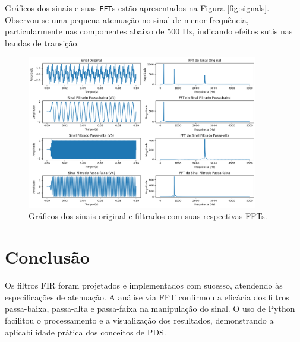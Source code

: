 \documentclass[a4paper,12pt]{article}
\begin{document}
Gráficos dos sinais e suas \texttt{FFT}s estão apresentados na Figura \ref{fig:signals}. Observou-se uma pequena atenuação no sinal de menor frequência, particularmente nas componentes abaixo de 500 Hz, indicando efeitos sutis nas bandas de transição.

\begin{figure}[h!]
    \centering
    \includegraphics[width=0.9\textwidth]{output.png}
    \caption{Gráficos dos sinais original e filtrados com suas respectivas FFTs.}
    \label{fig:results}
\end{figure}




\section{Conclusão}
Os filtros FIR foram projetados e implementados com sucesso, atendendo às especificações de atenuação. A análise via FFT confirmou a eficácia dos filtros passa-baixa, passa-alta e passa-faixa na manipulação do sinal. O uso de Python facilitou o processamento e a visualização dos resultados, demonstrando a aplicabilidade prática dos conceitos de PDS.
\end{document}
